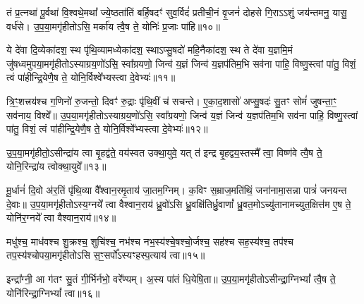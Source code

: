 {\anuvakamend[{अ॒यं वे॒नः पञ्च॑विꣳशतिः॥८॥}]}

तं प्र॒त्नथा॑ पू॒र्वथा॑ वि॒श्वथे॒मथा᳚ ज्ये॒ष्ठता॑तिं बर्\mbox{}हि॒षदꣳ॑ सुव॒र्विदं॑ प्रतीची॒नं वृ॒जनं॑ दोहसे गि॒रा\-ऽ\-ऽशुं जय॑न्तमनु॒ यासु॒ वर्ध॑से। उ॒प॒या॒मगृ॑हीतो\-ऽसि॒ मर्का॑य त्वै॒ष ते॒ योनिः॑ प्र॒जाः पा॑हि॥१०॥

{\anuvakamend[{तꣳ षड्विꣳ॑शतिः॥९॥}]}

ये दे॑वा दि॒व्येका॑दश॒ स्थ पृ॑थि॒व्यामध्येका॑दश॒ स्था\-ऽप्सु॒षदो॑ महि॒नैका॑दश॒ स्थ ते दे॑वा य॒ज्ञमि॒मं जु॑षध्वमुपया॒मगृ॑हीतो\-ऽस्याग्रय॒णो॑\-ऽसि॒ स्वा᳚ग्रयणो॒ जिन्व॑ य॒ज्ञं जिन्व॑ य॒ज्ञप॑तिम॒भि सव॑ना पाहि॒ विष्णु॒स्त्वां पा॑तु॒ विशं॒ त्वं पा॑हीन्द्रि॒येणै॒ष ते॒ योनि॒र्विश्वे᳚भ्यस्त्वा दे॒वेभ्यः॑॥११॥

{\anuvakamend[{ये दे॑वा॒स्त्रिच॑त्वारिꣳशत्॥10॥}]}

त्रि॒ꣳ॒शत्त्रय॑श्च ग॒णिनो॑ रु॒जन्तो॒ दिवꣳ॑ रु॒द्राः पृ॑थि॒वीं च॑ सचन्ते। ए॒का॒द॒शासो॑ अप्सु॒षदः॑ सु॒तꣳ सोमं॑ जुषन्ता॒ꣳ॒ सव॑नाय॒ विश्वे᳚॥ उ॒प॒या॒मगृ॑हीतो\-ऽस्याग्रय॒णो॑\-ऽसि॒ स्वा᳚ग्रयणो॒ जिन्व॑ य॒ज्ञं जिन्व॑ य॒ज्ञप॑तिम॒भि सव॑ना पाहि॒ विष्णु॒स्त्वां पा॑तु॒ विशं॒ त्वं पा॑हीन्द्रि॒येणै॒ष ते॒ योनि॒र्विश्वे᳚भ्यस्त्वा दे॒वेभ्यः॑॥१२॥

{\anuvakamend[{त्रि॒ꣳ॒शद् द्विच॑त्वारिꣳशत्॥11॥}]}

उ॒प॒या॒मगृ॑हीतो॒\-ऽसीन्द्रा॑य त्वा बृ॒हद्व॑ते॒ वय॑स्वत उक्था॒युवे॒ यत् त॑ इन्द्र बृ॒हद्वय॒स्तस्मै᳚ त्वा॒ विष्ण॑वे त्वै॒ष ते॒ योनि॒रिन्द्रा॑य त्वोक्था॒युवे᳚॥१३॥

{\anuvakamend[{उ॒प॒या॒मगृ॑हीतो॒ द्वाविꣳ॑शतिः॥12॥}]}

मू॒र्धानं॑ दि॒वो अ॑र॒तिं पृ॑थि॒व्या वै᳚श्वान॒रमृ॒ताय॑ जा॒तम॒ग्निम्। क॒विꣳ स॒म्राज॒मति॑थिं॒ जना॑नामा॒सन्ना पात्रं॑ जनयन्त दे॒वाः॥ उ॒प॒या॒मगृ॑हीतो\-ऽस्य॒ग्नये᳚ त्वा वैश्वान॒राय॑ ध्रु॒वो॑\-ऽसि ध्रु॒वक्षि॑तिर्ध्रु॒वाणां᳚ ध्रु॒वत॒मो\-ऽच्यु॑तानामच्युत॒क्षित्त॑म ए॒ष ते॒ योनि॑र॒ग्नये᳚ त्वा वैश्वान॒राय॑॥१४॥

{\anuvakamend[{मू॒र्धानं॒ पञ्च॑त्रिꣳशत्॥13॥}]}

मधु॑श्च॒ माध॑वश्च शु॒क्रश्च॒ शुचि॑श्च॒ नभ॑श्च नभ॒स्य॑श्चे॒षश्चो॒र्जश्च॒ सह॑श्च सह॒स्य॑श्च॒ तप॑श्च तप॒स्य॑श्चोपया॒मगृ॑हीतो\-ऽसि स॒ꣳ॒सर्पो᳚\-ऽस्यꣳहस्प॒त्याय॑ त्वा॥१५॥

{\anuvakamend[{मधु॑स्त्रि॒ꣳ॒शत्॥14॥}]}

इन्द्रा᳚ग्नी॒ आ ग॑तꣳ सु॒तं गी॒र्भिर्नभो॒ वरे᳚ण्यम्। अ॒स्य पा॑तं धि॒येषि॒ता॥ उ॒प॒या॒मगृ॑हीतो\-ऽसीन्द्रा॒ग्नि\-भ्यां᳚ त्वै॒ष ते॒ योनि॑रिन्द्रा॒ग्नि\-भ्यां᳚ त्वा॥१६॥

